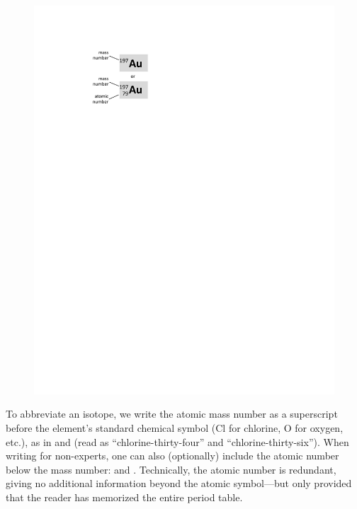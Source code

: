 {{\begin{figure}
\begin{center}
\vspace{-0.35in}
\includegraphics[scale=0.85]{appendices/isotope_abbreviations.pdf}
\end{center}
\end{figure}
To abbreviate an isotope, we write the atomic mass number as a superscript before the element's standard chemical symbol (Cl for chlorine, O for oxygen, etc.), as in  and  (read as ``chlorine-thirty-four'' and ``chlorine-thirty-six'').
When writing for non-experts, one can also (optionally) include the atomic number 
below the mass number:  and .  
Technically, the atomic number is redundant, giving no additional information beyond the atomic symbol---but only provided that the reader has memorized the entire period table.

}}
